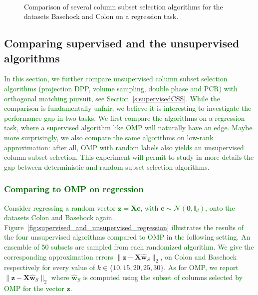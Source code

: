 \documentclass[twoside,11pt]{book}
\newcommand{\rev}[1]{\textcolor{darkgreen}{#1}}
\numberwithin{theorem}{chapter}
\numberwithin{definition}{chapter}
\numberwithin{proposition}{chapter}
\numberwithin{corollary}{chapter}
\numberwithin{example}{chapter}
\numberwithin{lemma}{chapter}
\begin{document}
\begin{figure}
\\
\caption{Comparison of several column subset selection algorithms for the datasets Basehock and Colon on a regression task. \label{fig:unsupervised_regression}}
\end{figure}


\subsection{Comparing supervised and the unsupervised algorithms}\label{sec:num_sim_regression_2}
\rev{
In this section, we further compare unsupervised column subset selection algorithms (projection DPP, volume sampling, double phase and PCR) with orthogonal matching pursuit, see Section~\ref{s:supervisedCSS}. While the comparison is fundamentally unfair, we believe it is interesting to investigate the performance gap in two tasks. We first compare the algorithms on a regression task, where a supervised algorithm like OMP will naturally have an edge. Maybe more surprisingly, we also compare the same algorithms on low-rank approximation: after all, OMP with random labels also yields an unsupervised column subset selection. This experiment will permit to study in more details the gap between deterministic and random subset selection algorithms.
}

\rev{\subsubsection{Comparing to OMP on regression}\label{sec:num_sim_OMP_vs_CSSP_in_regression}}

\rev{Consider regressing a random vector $\mathbf{z} = \bm{X} \bm{c}$, with $\bm{c} \sim \mathcal{N}(\bm{0}, \mathbb{I}_{d})$, onto the datasets Colon and Basehock again.}
\rev{Figure~\ref{fig:supervised_and_unsupervised_regression} illustrates the results of the four unsupervised algorithms compared to OMP in the following setting.
An ensemble of 50 subsets are sampled from each randomized algorithm. We give the corresponding approximation errors} $\|\mathbf{z} - \bm{X}\hat{\bm{w}}_S\|_{2}$, \rev{on Colon and Basehock respectively for every value of} $k \in \{10,15,20,25,30\}$. \rev{As for OMP, we report} $\|\mathbf{z} - \bm{X}\hat{\bm{w}}_S\|_{2}$ \rev{where $\hat{\bm{w}}_S$ is computed using the subset of columns selected by OMP for the vector $\mathbf{z}$.}
\end{document}
